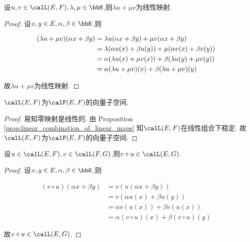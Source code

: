 \begin{prop} \label{prop:linear_combination_of_linear_maps}
    设$u, v \in \calL(E, F), \lambda, \mu \in \bbK$,则$\lambda u + \mu v$为线性映射.
\end{prop}

\begin{proof}
    设$x, y \in E, \alpha, \beta \in \bbK$,则

    \begin{align*}
        (\lambda u + \mu v)(\alpha x + \beta y) & = \lambda u(\alpha x + \beta y) + \mu v(\alpha x + \beta y) \\
        & = \lambda (\alpha u(x) + \beta u(y)) + \mu (\alpha v(x) + \beta v(y)) \\
        & = \alpha (\lambda u(x) + \mu v(x)) + \beta (\lambda u(y) + \mu v(y)) \\
        & = \alpha (\lambda u + \mu v)(x) + \beta (\lambda u + \mu v)(y) \qedhere
    \end{align*}

    故$\lambda u + \mu v$为线性映射.
\end{proof}

\begin{prop} \label{prop:linear_space_of_linear_maps}
    $\calL(E, F)$为$\calF(E, F)$的向量子空间.
\end{prop}

\begin{proof}
    易知零映射是线性的.
    由 Proposition \ref{prop:linear_combination_of_linear_maps} 知$\calL(E, F)$在线性组合下稳定.
    故$\calL(E, F)$为$\calF(E, F)$的向量子空间.
\end{proof}

\begin{prop} \label{prop:composition_of_linear_maps}
    设$u \in \calL(E, F), v \in \calL(F, G)$,则$v \circ u \in \calL(E, G)$.
\end{prop}

\begin{proof}
    设$x, y \in E, \alpha, \beta \in \bbK$,则

    \begin{align*}
        (v \circ u)(\alpha x + \beta y) & = v(u(\alpha x + \beta y)) \\
        & = v(\alpha u(x) + \beta u(y)) \\
        & = \alpha v(u(x)) + \beta v(u(x)) \\
        & = \alpha (v \circ u)(x) + \beta (v \circ u)(y)
    \end{align*}

    故$v \circ u \in \calL(E, G)$.
\end{proof}

